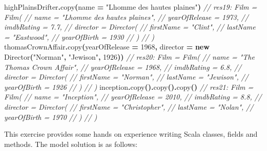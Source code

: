 \documentclass[11pt,a5paper,]{book}
\newenvironment{Shaded}{\begin{snugshade}}{\end{snugshade}}
\newcommand{\CommentTok}[1]{\textcolor[rgb]{0.56,0.35,0.01}{\textit{#1}}}
\newcommand{\DecValTok}[1]{\textcolor[rgb]{0.00,0.00,0.81}{#1}}
\newcommand{\FunctionTok}[1]{\textcolor[rgb]{0.00,0.00,0.00}{#1}}
\newcommand{\KeywordTok}[1]{\textcolor[rgb]{0.13,0.29,0.53}{\textbf{#1}}}
\newcommand{\NormalTok}[1]{#1}
\newcommand{\OperatorTok}[1]{\textcolor[rgb]{0.81,0.36,0.00}{\textbf{#1}}}
\newcommand{\StringTok}[1]{\textcolor[rgb]{0.31,0.60,0.02}{#1}}
\begin{document}
\begin{Shaded}
\begin{Highlighting}[]
\NormalTok{highPlainsDrifter}\OperatorTok{.}\FunctionTok{copy}\OperatorTok{(}\NormalTok{name }\OperatorTok{=} \StringTok{"L\textquotesingle{}homme des hautes plaines"}\OperatorTok{)}
\CommentTok{// res19: Film = Film(}
\CommentTok{//   name = "L\textquotesingle{}homme des hautes plaines",}
\CommentTok{//   yearOfRelease = 1973,}
\CommentTok{//   imdbRating = 7.7,}
\CommentTok{//   director = Director(}
\CommentTok{//     firstName = "Clint",}
\CommentTok{//     lastName = "Eastwood",}
\CommentTok{//     yearOfBirth = 1930}
\CommentTok{//   )}
\CommentTok{// )}
\NormalTok{thomasCrownAffair}\OperatorTok{.}\FunctionTok{copy}\OperatorTok{(}\NormalTok{yearOfRelease }\OperatorTok{=} \DecValTok{1968}\OperatorTok{,}
\NormalTok{  director }\OperatorTok{=} \KeywordTok{new} \FunctionTok{Director}\OperatorTok{(}\StringTok{"Norman"}\OperatorTok{,} \StringTok{"Jewison"}\OperatorTok{,} \DecValTok{1926}\OperatorTok{))}
\CommentTok{// res20: Film = Film(}
\CommentTok{//   name = "The Thomas Crown Affair",}
\CommentTok{//   yearOfRelease = 1968,}
\CommentTok{//   imdbRating = 6.8,}
\CommentTok{//   director = Director(}
\CommentTok{//     firstName = "Norman",}
\CommentTok{//     lastName = "Jewison",}
\CommentTok{//     yearOfBirth = 1926}
\CommentTok{//   )}
\CommentTok{// )}
\NormalTok{inception}\OperatorTok{.}\FunctionTok{copy}\OperatorTok{().}\FunctionTok{copy}\OperatorTok{().}\FunctionTok{copy}\OperatorTok{()}
\CommentTok{// res21: Film = Film(}
\CommentTok{//   name = "Inception",}
\CommentTok{//   yearOfRelease = 2010,}
\CommentTok{//   imdbRating = 8.8,}
\CommentTok{//   director = Director(}
\CommentTok{//     firstName = "Christopher",}
\CommentTok{//     lastName = "Nolan",}
\CommentTok{//     yearOfBirth = 1970}
\CommentTok{//   )}
\CommentTok{// )}
\end{Highlighting}
\end{Shaded}

This exercise provides some hands on experience writing Scala classes,
fields and methods. The model solution is as follows:
\end{document}
